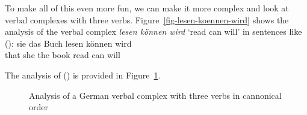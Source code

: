 To make all of this even more fun, we can make it more complex and look at verbal complexes with
three verbs. Figure~\vref{fig-lesen-koennen-wird} shows the analysis of the verbal complex \emph{lesen können wird} `read
can will' in sentences like ():
\ea
\label{ex-lesen-koennen-wird}
\gll [dass] sie das Buch lesen können wird\\
     \spacebr{}that she the book read can will\\
\z

\noindent
The analysis of () is provided in Figure~\ref{fig-lesen-koennen-wird}.
\begin{figure}
\caption{\label{fig-lesen-koennen-wird}Analysis of a German verbal complex with three verbs in cannonical order}
\end{figure}

